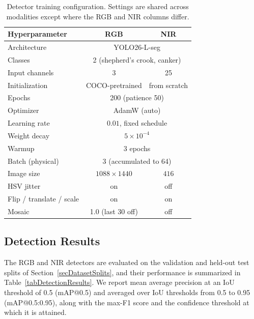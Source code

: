 \begin{table}[h]
    \centering
    \caption{Detector training configuration. Settings are shared
             across modalities except where the RGB and NIR columns
             differ.}
    \label{tabTrainingConfig}
    \begin{tabular}{l|cc}
        \hline
        Hyperparameter & RGB & NIR \\
        \hline
        Architecture      & \multicolumn{2}{c}{YOLO26-L-seg} \\
        Classes           & \multicolumn{2}{c}{2 (shepherd's crook, canker)} \\
        Input channels    & 3                & 25 \\
        Initialization    & COCO-pretrained  & from scratch \\
        Epochs            & \multicolumn{2}{c}{200 (patience 50)} \\
        Optimizer         & \multicolumn{2}{c}{AdamW (auto)} \\
        Learning rate     & \multicolumn{2}{c}{$0.01$, fixed schedule} \\
        Weight decay      & \multicolumn{2}{c}{$5\times10^{-4}$} \\
        Warmup            & \multicolumn{2}{c}{3 epochs} \\
        Batch (physical)  & \multicolumn{2}{c}{3 (accumulated to 64)} \\
        Image size        & $1088\times1440$ & $416$ \\
        HSV jitter        & on               & off \\
        Flip / translate / scale & on         & on \\
        Mosaic            & 1.0 (last 30 off) & off \\
        \hline
    \end{tabular}
\end{table}

\subsection{Detection Results} \label{secDetectionResults}

The RGB and NIR detectors are evaluated on the validation and held-out
test splits of Section~\ref{secDatasetSplits}, and their performance is
summarized in Table~\ref{tabDetectionResults}.
We report mean average precision at an IoU threshold of 0.5 (mAP@0.5)
and averaged over IoU thresholds from 0.5 to 0.95 (mAP@0.5:0.95), along
with the max-F1 score and the confidence threshold at which it is
attained.

